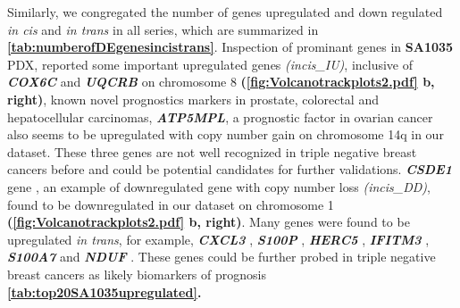 Similarly, we congregated the number of genes upregulated and down regulated \textit{in cis} and \textit{in trans} in all series, which are summarized in \textbf{\autoref{tab:numberofDEgenesincistrans}}.
 Inspection of prominant genes in \textbf{SA1035} PDX, reported some important upregulated genes \textit{(incis\_IU)}, inclusive of \textit{\textbf{COX6C}} \cite{yang2018overexpression,chang2017estrogen} and 
 \textit{\textbf{UQCRB}} \cite{kim2017mitochondrial,park2017mitochondrial} on chromosome 8 \textbf{(\autoref{fig:Volcanotrackplots2.pdf} b, right)}, known novel prognostics markers in prostate, colorectal and hepatocellular carcinomas, \textit{\textbf{ATP5MPL}}, a prognostic factor in ovarian cancer also seems to be upregulated with copy number gain on chromosome 14q in our dataset. These three genes are not well recognized in triple negative breast cancers before and could be potential candidates for further validations. \textit{\textbf{CSDE1} } gene \cite{martinez2019unr}, an example of downregulated gene with copy number loss \textit{(incis\_DD)}, found to be downregulated in our dataset on chromosome 1 \textbf{(\autoref{fig:Volcanotrackplots2.pdf} b, right)}. Many genes were found to be upregulated \textit{in trans}, for example, \textit{\textbf{CXCL3} }\cite{gui2016overexpression, karin2020cxcr3}, \textit{\textbf{S100P}} \cite{arumugam2011s100p,cong2020calcium}, 
\textit{\textbf{HERC5}} \cite{wrage2015identification}, 
\textit{\textbf{IFITM3}} \cite{liu2019ifitm3}, \textit{\textbf{S100A7}} 
\cite{zhang2019clinical, mayama2018olfm} and \textit{\textbf{NDUF}} 
\cite{li2015down}. These genes could be further probed in triple negative breast cancers as likely biomarkers of prognosis \textbf{\autoref{tab:top20SA1035upregulated}.}


